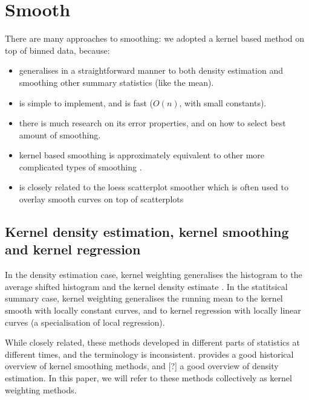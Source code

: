 \documentclass[journal]{vgtc}                %
\begin{document}
\section{Smooth}
\label{sec:smooth}


There are many approaches to smoothing: we adopted a kernel based method on top of binned data, because:

\begin{itemize}
  \item generalises in a straightforward manner to both density estimation and smoothing other summary statistics (like the mean).

  \item is simple to implement, and is fast ($O(n)$, with small constants).
  
  \item there is much research on its error properties, and on how to select best amount of smoothing.
  
  \item kernel based smoothing is approximately equivalent to other more complicated types of smoothing \citep{silverman:1984}.
  
  \item is closely related to the {\sc loess} scatterplot smoother \citep{cleveland:1979} which is often used to overlay smooth curves on top of scatterplots

\end{itemize}

\subsection{Kernel density estimation, kernel smoothing and kernel regression}

In the density estimation case, kernel weighting generalises the histogram to the average shifted histogram \citep{scott:1985} and the kernel density estimate \citep{scott:1992}. In the statitsical summary case, kernel weighting generalises the running mean to the kernel smooth with locally constant curves, and to kernel regression with locally linear curves (a specialisation of local regression).

While closely related, these methods developed in different parts of statistics at different times, and the terminology is inconsistent. \citep{cleveland:1996} provides a good historical overview of kernel smoothing methods, and [?] a good overview of density estimation. In this paper, we will refer to these methods collectively as kernel weighting methods.
\end{document}
